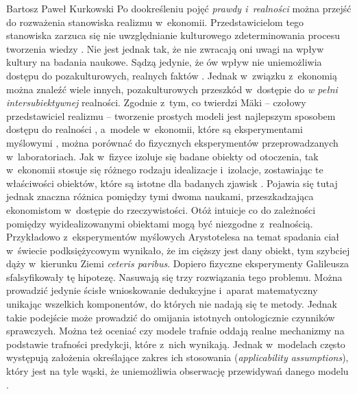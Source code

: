\begin{artplenv}{Bartosz Paweł Kurkowski}
Po dookreśleniu pojęć \textit{prawdy i~realności }można przejść do rozważenia stanowiska realizmu w~ekonomii.
Przedstawicielom tego stanowiska zarzuca się nie uwzględnianie kulturowego zdeterminowania procesu tworzenia wiedzy
\parencite[s.~396]{zboron_podzial_2014}.
Nie jest jednak tak, że nie zwracają oni uwagi na wpływ kultury na
badania naukowe. Sądzą jedynie, że ów wpływ nie uniemożliwia dostępu do pozakulturowych, realnych faktów
\parencite[s.~72]{kincaid_realistic_2009}.
Jednak w~związku z~ekonomią można znaleźć wiele innych, pozakulturowych
przeszkód w~dostępie do \textit{w pełni intersubiektywnej} realności. Zgodnie z~tym, co twierdzi Mäki -- czołowy
przedstawiciel realizmu -- tworzenie prostych modeli jest najlepszym sposobem dostępu do realności
\parencite[s.~18]{kincaid_realistic_2009},
a~modele w~ekonomii, które są eksperymentami myślowymi
\parencite[s.~16]{kincaid_realistic_2009},
można porównać do fizycznych eksperymentów
przeprowadzanych w~laboratoriach. Jak w~fizyce izoluje się badane obiekty od otoczenia,
tak w~ekonomii stosuje się różnego rodzaju
idealizacje i~izolacje, zostawiając te właściwości obiektów, które są istotne dla badanych zjawisk
\parencite[s.~14]{kincaid_realistic_2009}.
Pojawia się tutaj jednak znaczna różnica pomiędzy tymi dwoma naukami,
przeszkadzająca ekonomistom w~dostępie do rzeczywistości. Otóż intuicje co do zależności pomiędzy wyidealizowanymi
obiektami mogą być niezgodne z~realnością. Przykładowo z~eksperymentów myślowych Arystotelesa na temat spadania
ciał w~świecie podksiężycowym wynikało, że im cięższy jest dany obiekt, tym szybciej dąży w~kierunku Ziemi \textit{ceteris
paribus}. Dopiero fizyczne eksperymenty Galileusza sfalsyfikowały tę hipotezę. Nasuwają się trzy rozwiązania tego
problemu. Można prowadzić jedynie ścisłe wnioskowanie dedukcyjne i~aparat matematyczny unikając wszelkich komponentów,
do których nie nadają się te metody. Jednak takie podejście może prowadzić do omijania istotnych ontologicznie
czynników sprawczych. Można też oceniać czy modele trafnie oddają realne mechanizmy na podstawie trafności predykcji,
które z~nich wynikają. Jednak w~modelach często występują założenia określające zakres ich stosowania
(\textit{applicability assumptions}), który jest na tyle wąski, że uniemożliwia obserwację przewidywań danego modelu
\parencite[s.~264]{gorazda_filozofia_2014}.

\end{artplenv}
